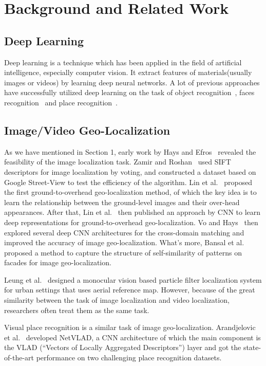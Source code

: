 \section{Background and Related Work}
\subsection{Deep Learning}
\par
Deep learning is a technique which has been applied in the field of artificial intelligence, especially computer vision. It extract features of materials(usually images or videos) by learning deep neural networks. A lot of previous approaches have successfully utilized deep learning on the task of object recognition~\cite{krizhevsky2012imagenet}, faces recognition~\cite{taigman2014deepface} and place recognition~\cite{zhou2014learning,lin2015learning,Arandjelovic16,workman2015wide,weyand2016planet}. 
\subsection{Image/Video Geo-Localization}
\par
As we have mentioned in Section 1, early work by Hays and Efros~\cite{hays2008im2gps} revealed the feasibility of the image localization task. Zamir and Roshan~\cite{zamir2010accurate} used SIFT descriptors for image localization by voting, and constructed a dataset based on Google Street-View to test the efficiency of the algorithm. Lin et al.~\cite{lin2013cross} proposed the first ground-to-overhead geo-localization method, of which the key idea is to learn the relationship between the ground-level images and their over-head appearances. After that, Lin et al.~\cite{lin2015learning} then published an approach by CNN to learn deep representations for ground-to-overhead geo-localization. Vo and Hays~\cite{vo2016localizing} then explored several deep CNN architectures for the cross-domain matching and improved the accuracy of image geo-localization. What's more, Bansal et al.~\cite{bansal2012ultra} proposed a method to capture the structure of self-similarity of patterns on facades for image geo-localization.
\par
Leung et al.~\cite{leung2008localization} designed a monocular vision based particle filter localization system for urban settings that uses aerial reference map. However, because of the great similarity between the task of image localization and video localization, researchers often treat them as the same task.
\par
Visual place recognition is a similar task of image geo-localization. Arandjelovic et al.~\cite{Arandjelovic16} developed NetVLAD, a CNN architecture of which the main component is the VLAD (``Vectors of Locally Aggregated Descriptors'') layer and got the state-of-the-art performance on two challenging place recognition datasets. 

